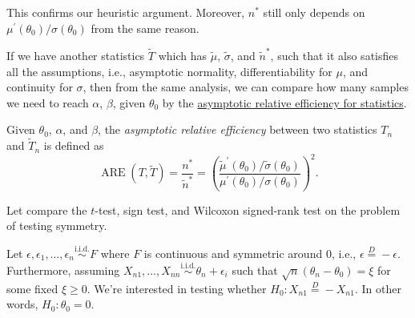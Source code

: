 \begin{remark}
	This confirms our heuristic argument. Moreover, \(n^{\ast} \) still only depends on \(\mu ^{\prime} (\theta _0) / \sigma (\theta _0)\) from the same reason.
\end{remark}

If we have another statistics \(\widetilde{T} \) which has \(\widetilde{\mu} \), \(\widetilde{\sigma} \), and \(\widetilde{n} ^{\ast} \), such that it also satisfies all the assumptions, i.e., asymptotic normality, differentiability for \(\mu \), and continuity for \(\sigma \), then from the same analysis, we can compare how many samples we need to reach \(\alpha \), \(\beta \), given \(\theta _0\) by the \hyperref[def:asymptotic-relative-efficiency-statistics]{asymptotic relative efficiency for statistics}.

\begin{definition}\label{def:asymptotic-relative-efficiency-statistics}
	Given \(\theta _0\), \(\alpha \), and \(\beta \), the \emph{asymptotic relative efficiency} between two statistics \(T_n\) and \(\widetilde{T} _n\) is defined as
	\[
		\operatorname{ARE}(T, \widetilde{T} )
		= \frac{n^{\ast} }{\widetilde{n} ^{\ast} }
		= \left( \frac{\widetilde{\mu} ^{\prime} (\theta _0) / \widetilde{\sigma} (\theta _0)}{\mu ^{\prime} (\theta _0) / \sigma (\theta _0)} \right) ^2.
	\]
\end{definition}

Let compare the \(t\)-test, sign test, and Wilcoxon signed-rank test on the problem of testing symmetry.

\begin{problem*}
	Let \(\epsilon , \epsilon _1, \dots, \epsilon _n \overset{\text{i.i.d.} }{\sim } F\) where \(F\) is continuous and symmetric around \(0\), i.e., \(\epsilon \overset{D}{=} -\epsilon \). Furthermore, assuming \(X_{n1}, \dots , X_{nn} \overset{\text{i.i.d.} }{\sim } \theta _n + \epsilon _i\) such that \(\sqrt{n} (\theta _n - \theta _0) = \xi \) for some fixed \(\xi \geq 0\). We're interested in testing whether \(H_0 \colon X_{n1} \overset{D}{=} -X_{n1}\). In other words, \(H_0 \colon \theta _0 = 0\).
\end{problem*}

